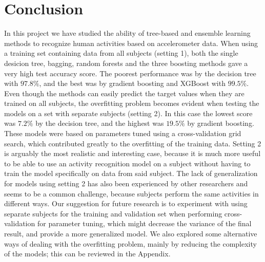 \section{Conclusion}\label{sec:Conclusion}

In this project we have studied the ability of tree-based and ensemble learning methods to recognize human activities based on accelerometer data. When using a training set containing data from all subjects (setting 1), both the single desicion tree, bagging, random forests and the three boosting methods gave a very high test accuracy score. The poorest performance was by the decision tree with $97.8\%$, and the best was by gradient boosting and XGBoost with $99.5\%$. Even though the methods can easily predict the target values when they are trained on all subjects, the overfitting problem becomes evident when testing the models on a set with separate subjects (setting 2). In this case the lowest score was $7.2\%$ by the decision tree, and the highest was $19.5\%$ by gradient boosting. These models were based on parameters tuned using a cross-validation grid search, which contributed greatly to the overfitting of the training data. Setting 2 is arguably the most realistic and interesting case, because it is much more useful to be able to use an activity recognition model on a subject without having to train the model specifically on data from said subject. The lack of generalization for models using setting 2 has also been experienced by other researchers\cite{Jordao2018} and seems to be a common challenge, because subjects perform the same activities in different ways. Our suggestion for future research is to experiment with using separate subjects for the training and validation set when performing cross-validation for parameter tuning, which might decrease the variance of the final result, and provide a more generalized model. We also explored some alternative ways of dealing with the overfitting problem, mainly by reducing the complexity of the models; this can be reviewed in the Appendix.